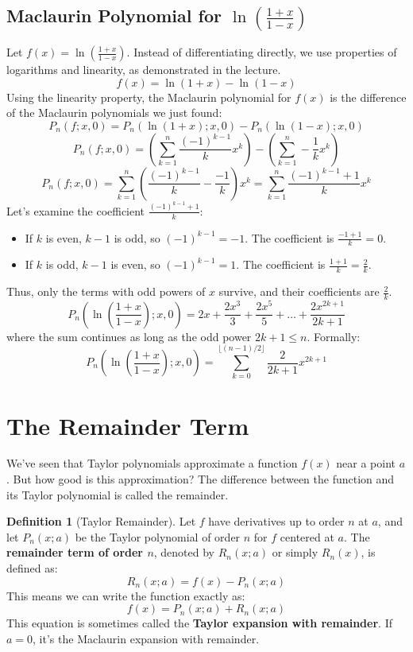 \documentclass[11pt]{article}
\theoremstyle{definition}
\newtheorem{definition}[theorem]{Definition}
\theoremstyle{remark}
\begin{document}
\subsection{Maclaurin Polynomial for \texorpdfstring{$\ln\left(\frac{1+x}{1-x}\right)$}{ln((1+x)/(1-x))}}
Let $f(x) = \ln\left(\frac{1+x}{1-x}\right)$. Instead of differentiating directly, we use properties of logarithms and linearity, as demonstrated in the lecture.
\[ f(x) = \ln(1+x) - \ln(1-x) \]
Using the linearity property, the Maclaurin polynomial for $f(x)$ is the difference of the Maclaurin polynomials we just found:
\[ P_n(f; x, 0) = P_n(\ln(1+x); x, 0) - P_n(\ln(1-x); x, 0) \]
\[ P_n(f; x, 0) = \left( \sum_{k=1}^n \frac{(-1)^{k-1}}{k}x^k \right) - \left( \sum_{k=1}^n -\frac{1}{k}x^k \right) \]
\[ P_n(f; x, 0) = \sum_{k=1}^n \left( \frac{(-1)^{k-1}}{k} - \frac{-1}{k} \right) x^k = \sum_{k=1}^n \frac{(-1)^{k-1} + 1}{k} x^k \]
Let's examine the coefficient $\frac{(-1)^{k-1} + 1}{k}$:
\begin{itemize}
    \item If $k$ is even, $k-1$ is odd, so $(-1)^{k-1} = -1$. The coefficient is $\frac{-1+1}{k} = 0$.
    \item If $k$ is odd, $k-1$ is even, so $(-1)^{k-1} = 1$. The coefficient is $\frac{1+1}{k} = \frac{2}{k}$.
\end{itemize}
Thus, only the terms with odd powers of $x$ survive, and their coefficients are $\frac{2}{k}$.
\[ P_n\left(\ln\left(\frac{1+x}{1-x}\right); x, 0\right) = 2x + \frac{2x^3}{3} + \frac{2x^5}{5} + \dots + \frac{2x^{2k+1}}{2k+1} \]
where the sum continues as long as the odd power $2k+1 \le n$. Formally:
\[ P_n\left(\ln\left(\frac{1+x}{1-x}\right); x, 0\right) = \sum_{k=0}^{\lfloor (n-1)/2 \rfloor} \frac{2}{2k+1}x^{2k+1} \]

\section{The Remainder Term}

We've seen that Taylor polynomials approximate a function $f(x)$ near a point $a$. But how good is this approximation? The difference between the function and its Taylor polynomial is called the remainder.

\begin{definition}[Taylor Remainder]
Let $f$ have derivatives up to order $n$ at $a$, and let $P_n(x; a)$ be the Taylor polynomial of order $n$ for $f$ centered at $a$. The \textbf{remainder term of order $n$}, denoted by $R_n(x; a)$ or simply $R_n(x)$, is defined as:
\begin{equation}
R_n(x; a) = f(x) - P_n(x; a)
\end{equation}
This means we can write the function exactly as:
\begin{equation}
f(x) = P_n(x; a) + R_n(x; a)
\end{equation}
This equation is sometimes called the \textbf{Taylor expansion with remainder}. If $a=0$, it's the Maclaurin expansion with remainder.
\end{definition}
\end{document}
